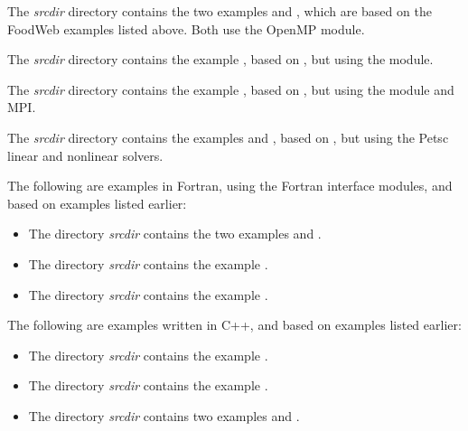 \vspace{0.2in}\noindent
The {\em srcdir} directory contains the
two examples  and ,
which are based on the FoodWeb examples listed above.  Both use the
OpenMP {\nvector} module.

\vspace{0.2in}\noindent
The {\em srcdir} directory contains the
example , based on ,
but using the  {\nvector} module.

\vspace{0.2in}\noindent
The {\em srcdir} directory contains the
example , based on ,
but using the  {\nvector} module and MPI.


\vspace{0.2in}\noindent
The {\em srcdir} directory contains the
examples  and ,
based on , but using the Petsc linear and
nonlinear solvers.

\vspace{0.2in}\noindent
The following are examples in Fortran, using the {\sundials}
Fortran interface modules, and based on examples listed earlier:

\begin{itemize}

\item The directory {\em srcdir}
contains the two examples  and
.

\item The directory {\em srcdir}
contains the example .

\item The directory {\em srcdir}
contains the example .

\end{itemize}

\vspace{0.2in}\noindent
The following are examples written in C++, and based on examples
listed earlier:

\begin{itemize}

\item The directory {\em srcdir} contains
the example .

\item The directory {\em srcdir} contains
the example .

\item The directory {\em srcdir} contains
two examples  and .

\end{itemize}


